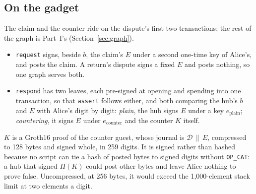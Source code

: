 \documentclass[11pt]{article}
\newcommand{\tx}[1]{\texttt{#1}}
\begin{document}
\subsection{On the gadget}
\label{sec:exitgadget}

The claim and the counter ride on the dispute's first two transactions;
the rest of the graph is Part~I's (Section~\ref{sec:graph}).
\begin{itemize}[leftmargin=1.5em]
\item \tx{request} signs, beside $b$, the claim's $E$ under a second
  one-time key of Alice's, and posts the claim. A return's dispute signs
  a fixed $E$ and posts nothing, so one graph serves both.
\item \tx{respond} has two leaves, each pre-signed at opening and
  spending into one transaction, so that \tx{assert} follows either, and
  both comparing the hub's $b$ and $E$ with Alice's digit by digit:
  \emph{plain}, the hub signs $E$ under a key $e_{\mathrm{plain}}$;
  \emph{countering}, it signs $E$ under $e_{\mathrm{counter}}$ and the
  counter $K$ itself.
\end{itemize}
$K$ is a Groth16 proof of the counter guest, whose journal is
$\mathcal{D} \,\|\, E$, compressed to 128 bytes and signed whole, in 259
digits. It is signed rather than hashed because no script can tie a
hash of posted bytes to signed digits without \tx{OP\_CAT}: a hub that
signed $H(K)$ could post other bytes and leave Alice nothing to prove
false. Uncompressed, at 256 bytes, it would exceed the 1,000-element
stack limit at two elements a digit.
\end{document}
